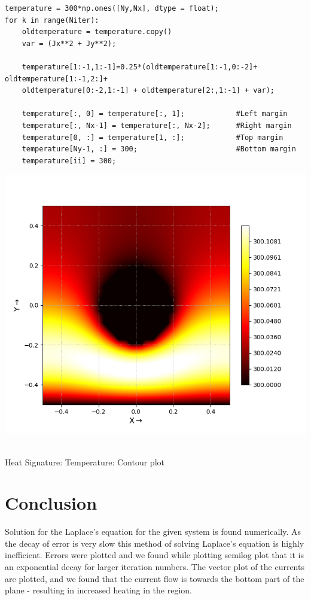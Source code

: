 \documentclass[12pt, a4paper]{report}
\begin{document}
\begin{verbatim}
temperature = 300*np.ones([Ny,Nx], dtype = float);
for k in range(Niter):
    oldtemperature = temperature.copy() 
    var = (Jx**2 + Jy**2);
    
    temperature[1:-1,1:-1]=0.25*(oldtemperature[1:-1,0:-2]+ oldtemperature[1:-1,2:]+
    oldtemperature[0:-2,1:-1] + oldtemperature[2:,1:-1] + var);
    
    temperature[:, 0] = temperature[:, 1];            #Left margin              
    temperature[:, Nx-1] = temperature[:, Nx-2];      #Right margin
    temperature[0, :] = temperature[1, :];            #Top margin
    temperature[Ny-1, :] = 300;                       #Bottom margin
    temperature[ii] = 300;                    
\end{verbatim}
\begin{center}
	\includegraphics[scale=0.6]{Figure11} 
	\caption{\\Heat Signature: Temperature: Contour plot}
	\label{fig:rawdata}
\end{center}

\section*{Conclusion}
Solution for the Laplace's equation for the given system is found numerically. As the decay of error is very slow this method of solving Laplace’s equation is highly inefficient. Errors were plotted and we found while plotting semilog plot that it is an exponential decay for larger iteration numbers. The vector plot of the currents are plotted, and we found that the current flow is towards the bottom part of the plane - resulting in increased heating in the region.
\end{document}
